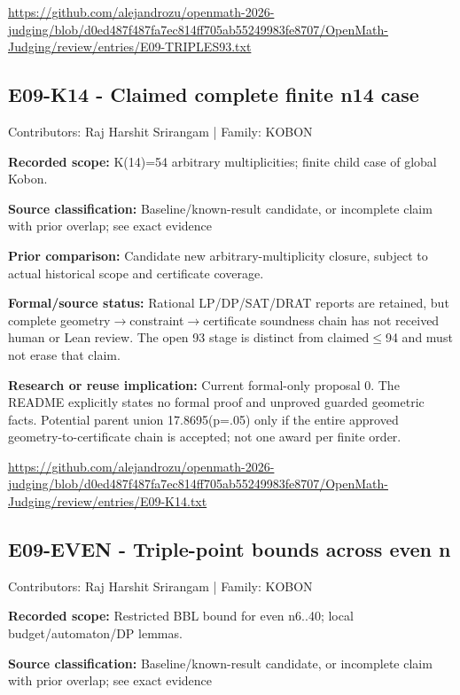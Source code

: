 \documentclass[11pt,a4paper]{article}
\begin{document}
{\small \url{https://github.com/alejandrozu/openmath-2026-judging/blob/d0ed487f487fa7ec814ff705ab55249983fe8707/OpenMath-Judging/review/entries/E09-TRIPLES93.txt}\par}

\begin{samepage}
\subsection{E09-K14  -  Claimed complete finite n14 case}
{\small Contributors: Raj Harshit Srirangam | Family: KOBON\par}

\textbf{Recorded scope:} K(14)=54 arbitrary multiplicities; finite child case of global Kobon.

\end{samepage}
\textbf{Source classification:} Baseline/known-result candidate, or incomplete claim with prior overlap; see exact evidence

\textbf{Prior comparison:} Candidate new arbitrary-multiplicity closure, subject to actual historical scope and certificate coverage.

\textbf{Formal/source status:} Rational LP/DP/SAT/DRAT reports are retained, but complete geometry\ensuremath{\to}constraint\ensuremath{\to}certificate soundness chain has not received human or Lean review. The open 93 stage is distinct from claimed\ensuremath{\leq}94 and must not erase that claim.

\textbf{Research or reuse implication:} Current formal-only proposal 0. The README explicitly states no formal proof and unproved guarded geometric facts. Potential parent union 17.8695(p=.05) only if the entire approved geometry-to-certificate chain is accepted; not one award per finite order.

{\small \url{https://github.com/alejandrozu/openmath-2026-judging/blob/d0ed487f487fa7ec814ff705ab55249983fe8707/OpenMath-Judging/review/entries/E09-K14.txt}\par}

\begin{samepage}
\subsection{E09-EVEN  -  Triple-point bounds across even n}
{\small Contributors: Raj Harshit Srirangam | Family: KOBON\par}

\textbf{Recorded scope:} Restricted BBL bound for even n6..40; local budget/automaton/DP lemmas.

\end{samepage}
\textbf{Source classification:} Baseline/known-result candidate, or incomplete claim with prior overlap; see exact evidence
\end{document}
